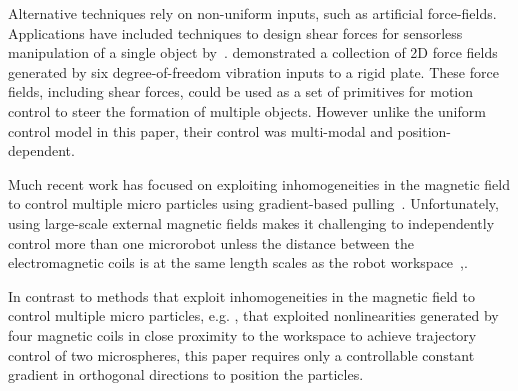 Alternative techniques rely on non-uniform inputs, such as artificial force-fields.
Applications have included techniques to design shear forces for sensorless manipulation of a single object by~\cite{lamiraux+2001:ra}.  
\cite{vose2012sliding} demonstrated a collection of 2D force fields generated by six degree-of-freedom vibration inputs to a rigid plate.  These force fields, including shear forces, could be used as a set of primitives for motion control to steer the formation of multiple objects. However unlike the uniform control model in this paper, their control was multi-modal and position-dependent.

Much recent work has focused on exploiting inhomogeneities in the magnetic field to control multiple micro particles  using gradient-based pulling~\cite{Salmanipour2018EightDOF,Denasi2018independent}.  
Unfortunately, using large-scale external magnetic fields makes it challenging to independently control more than one microrobot unless the  distance between the electromagnetic coils is at the same length scales as the robot workspace~\cite{diller2016six},\cite{Salmanipour2018EightDOF}.

In contrast to methods that exploit inhomogeneities in the magnetic field to control multiple micro particles, e.g. \cite{Denasi2018independent}, that exploited nonlinearities generated by four magnetic coils in close proximity to the workspace to achieve trajectory control of two microspheres, this paper requires only a controllable constant gradient in orthogonal directions to position the particles.



